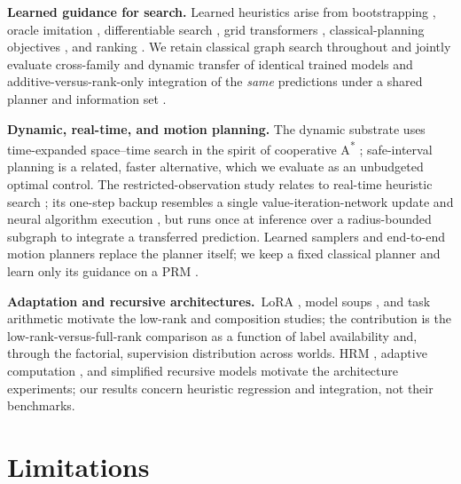 \documentclass[letterpaper]{article} %
\begin{document}
\textbf{Learned guidance for search.} Learned heuristics arise from bootstrapping \citep{arfaee2011bootstrap}, oracle imitation \citep{bhardwaj2017sail}, differentiable search \citep{yonetani2021neuralastar}, grid transformers \citep{kirilenko2023transpath}, classical-planning objectives \citep{ferber2020neural}, and ranking \citep{chrestien2023rank}. We retain classical graph search throughout and jointly evaluate cross-family and dynamic transfer of identical trained models and additive-versus-rank-only integration of the \emph{same} predictions under a shared planner and information set \citep{pohl1970,pearl1982semiadmissible,aine2016mha}.

\textbf{Dynamic, real-time, and motion planning.} The dynamic substrate uses time-expanded space--time search in the spirit of cooperative A\textsuperscript{*} \citep{silver2005cooperative}; safe-interval planning \citep{phillips2011sipp} is a related, faster alternative, which we evaluate as an unbudgeted optimal control. The restricted-observation study relates to real-time heuristic search \citep{korf1990rta,koenig2006rtaa}; its one-step backup resembles a single value-iteration-network update \citep{tamar2016vin,lee2018gppn} and neural algorithm execution \citep{velickovic2021nar}, but runs once at inference over a radius-bounded subgraph to integrate a transferred prediction. Learned samplers and end-to-end motion planners \citep{ichter2018sampling,qureshi2019mpnet} replace the planner itself; we keep a fixed classical planner and learn only its guidance on a PRM \citep{kavraki1996prm}.

\textbf{Adaptation and recursive architectures.}\ LoRA \citep{hu2021lora}, model soups \citep{wortsman2022soups}, and task arithmetic \citep{ilharco2022task} motivate the low-rank and composition studies; the contribution is the low-rank-versus-full-rank comparison as a function of label availability and, through the factorial, supervision distribution across worlds. HRM \citep{wang2025hrm}, adaptive computation \citep{graves2016act,banino2021pondernet}, and simplified recursive models \citep{jolicoeur2025trm} motivate the architecture experiments; our results concern heuristic regression and integration, not their benchmarks.

\section{Limitations}
\end{document}
